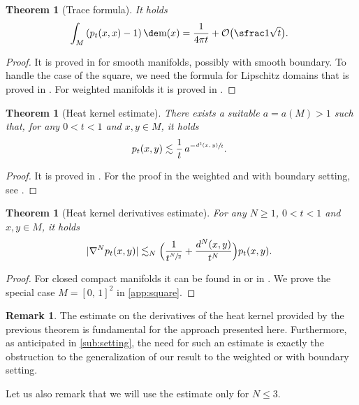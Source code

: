\documentclass[JEP,XML,SOM,Unicode]{cedram}
\newcounter{results}[section]
\theoremstyle{plain}
\newtheorem{theorem}[results]{Theorem}
\theoremstyle{definition}
\newtheorem{remark}[results]{Remark}
\numberwithin{equation}{section}
\newcommand{\bigo}{\ensuremath{\mathcal{O}}}
\newcommand{\cc}[2]{\ensuremath{\left[#1,\,#2\right]}}
\newcommand{\fullstop}{\ensuremath{\text{. }}}
\newcommand{\m}{\ensuremath{\mathrm m}}
\DeclarePairedDelimiter\abs{\lvert}{\rvert}
\begin{document}
\begin{theorem}[Trace formula]\label{thm:heat_ondiag}
It holds
\begin{equation*}
\int_M \left(p_t(x,x)-1\right)\de\m(x) = \frac 1{4\pi t} + \bigo\bigl(\sfrac 1{\sqrt{t}}\bigr)\fullstop
\end{equation*}
\end{theorem}
\begin{proof}
It is proved in \cite{McKeanSinger67} for smooth manifolds, possibly with smooth boundary.
To handle the case of the square, we need the formula for Lipschitz domains that is proved
in \cite{brown1993}.
For weighted manifolds it is proved in \cite[Th.\,1.5]{charalambous2017}.
\end{proof}

\begin{theorem}[Heat kernel estimate]\label{thm:heat_estimate}
There exists a suitable $a=a(M)>1$ such that, for any $0<t<1$ and $x,y\in M$, it holds
\begin{equation*}
p_t(x,y) \lesssim \frac 1t \,a^{-\sfrac{d^2(x,y)}{t}} \fullstop
\end{equation*}
\end{theorem}
\begin{proof}
It is proved in \cite[Th.\,4, Rem.\;at p.\,1050]{ChengLiYau81}.
For the proof in the weighted and with boundary setting, see \cite[Th.\,1.2]{Jiang-Li-Zhang15}.
\end{proof}

\begin{theorem}[Heat kernel derivatives estimate]\label{thm:heat_deriv}
For any $N\ge 1$, $0<t<1$ and $x,y\in M$, it holds
\begin{equation*}
\abs{\nabla^N p_t(x,y)} \lesssim_N
\Bigl(\frac 1{t^{\sfrac N2}} + \frac{d^N(x,y)}{t^N}\Bigr)p_t(x,y) \fullstop
\end{equation*}
\end{theorem}
\begin{proof}
For closed compact manifolds it can be found in \cite{stroock1998} or in \cite[Cor.\,1.2]{Hsu99}.
We prove the special case $M=\cc01^2$ in \cref{app:square}.
\end{proof}
\begin{remark}
The estimate on the derivatives of the heat kernel provided by the previous theorem is
fundamental for the approach presented here.
Furthermore, as anticipated in \cref{sub:setting}, the need for such an estimate is
exactly the obstruction to the generalization of our result to the weighted or with boundary setting.

Let us also remark that we will use the estimate only for $N\le 3$.
\end{remark}
\end{document}
